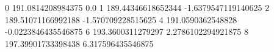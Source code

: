 0 191.0814208984375 0.0
1 189.44346618652344 -1.6379547119140625
2 189.51071166992188 -1.570709228515625
4 191.0590362548828 -0.0223846435546875
6 193.3600311279297 2.2786102294921875
8 197.39901733398438 6.317596435546875
